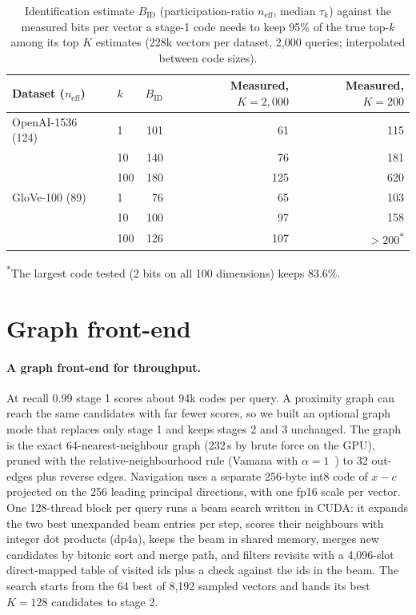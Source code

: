 \documentclass[10pt]{article}
\begin{document}
\begin{table}[!htbp]
\caption{Identification estimate $B_{\mathrm{ID}}$ (participation-ratio $n_{\mathrm{eff}}$, median $\tau_k$) against the measured bits per vector a stage-1 code needs to keep 95\% of the true top-$k$ among its top $K$ estimates (228k vectors per dataset, 2{,}000 queries; interpolated between code sizes).}
\label{tab:ident2}
\small
\begin{tabular}{llrrr}
\toprule
Dataset ($n_{\mathrm{eff}}$) & $k$ & $B_{\mathrm{ID}}$ & Measured, $K=2{,}000$ & Measured, $K=200$ \\
\midrule
OpenAI-1536 (124) & 1 & 101 & 61 & 115 \\
 & 10 & 140 & 76 & 181 \\
 & 100 & 180 & 125 & 620 \\
GloVe-100 (89) & 1 & 76 & 65 & 103 \\
 & 10 & 100 & 97 & 158 \\
 & 100 & 126 & 107 & $>200$\textsuperscript{*} \\
\bottomrule
\end{tabular}

{\footnotesize \textsuperscript{*}The largest code tested (2 bits on all 100 dimensions) keeps 83.6\%.}
\end{table}

\section{Graph front-end}\label{sn:graph}
\paragraph{A graph front-end for throughput.} At recall 0.99 stage 1 scores about 94k codes per query. A proximity graph can reach the same candidates with far fewer scores, so we built an optional graph mode that replaces only stage 1 and keeps stages 2 and 3 unchanged. The graph is the exact 64-nearest-neighbour graph (232\,s by brute force on the GPU), pruned with the relative-neighbourhood rule (Vamana with $\alpha=1$~\cite{subramanya2019diskann}) to 32 out-edges plus reverse edges. Navigation uses a separate 256-byte int8 code of $x-c$ projected on the 256 leading principal directions, with one fp16 scale per vector. One 128-thread block per query runs a beam search written in CUDA: it expands the two best unexpanded beam entries per step, scores their neighbours with integer dot products (dp4a), keeps the beam in shared memory, merges new candidates by bitonic sort and merge path, and filters revisits with a 4{,}096-slot direct-mapped table of visited ids plus a check against the ids in the beam. The search starts from the 64 best of 8{,}192 sampled vectors and hands its best $K=128$ candidates to stage 2.
\end{document}

